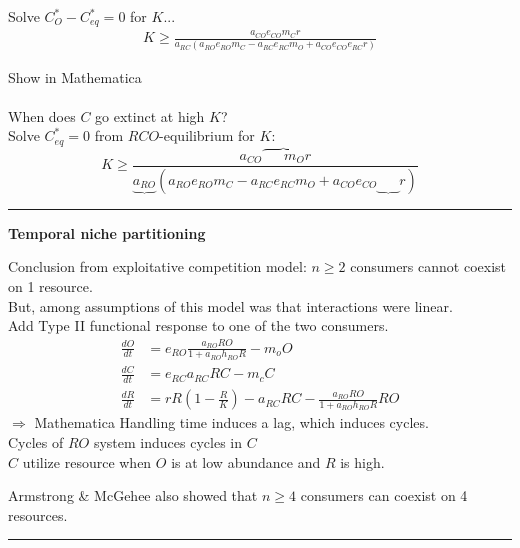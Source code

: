 \documentclass{article}
\newcommand{\note}[1]{\colorbox{gray!30}{#1}}
\newcommand{\ind}{\-\hspace{1cm}}
\newcommand*\circled[1]{\tikz[baseline=(char.base)]{
            \node[shape=circle,draw,inner sep=2pt] (char) {#1};}}
\begin{document}
\ind Solve $C_O^* - C_{eq}^* = 0 $ for $K$...\
\begin{align*}
	K \geq \frac{a_{CO}e_{CO}m_C r}{ a_{RC}(a_{RO}e_{RO}m_C - a_{RC}e_{RC}m_O + a_{CO}e_{CO}e_{RC}r)}
\end{align*}

\note{Show in Mathematica}\\

\circled{6}\\
When does $C$ go extinct at high $K$?\\
\ind Solve $C_{eq}^* = 0$ from $RCO$-equilibrium for $K$:\\
\begin{equation*}
	K \geq \frac{a_{CO}\overbrace{\phantom{e_{CO}}m_O} r}{ \underbrace{a_{RO}}(a_{RO}e_{RO}m_C - a_{RC}e_{RC}m_O + a_{CO}e_{CO}\underbrace{\phantom{e_{RC}}}r )}
\end{equation*}


\rule[0.5ex]{\linewidth}{1pt}

\begin{center}	\textbf{Temporal niche partitioning} \end{center}
Conclusion from exploitative competition model: $n\geq 2$ consumers cannot coexist on 1 resource.\\
But, among assumptions of this model was that interactions were linear.\\

Add Type II functional response to one of the two consumers.
\begin{align*}
	\frac{dO}{dt}&=e_{RO}\frac{a_{RO}R O}{1+a_{RO}h_{RO}R} - m_o O\\
	\frac{dC}{dt}&=e_{RC}a_{RC}RC - m_c C\\
	\frac{dR}{dt}&=r R \left(1-\frac{R}{K}\right) - a_{RC}RC - \frac{a_{RO}R O}{1+a_{RO}h_{RO}R}RO
\end{align*}
\note{$\Rightarrow$ Mathematica}
Handling time induces a lag, which induces cycles.\\
Cycles of $RO$ system induces cycles in $C$\\
\ind $C$ utilize resource when $O$ is at low abundance and $R$ is high. 

Armstrong \& McGehee also showed that $n \geq 4$ consumers can coexist on 4 resources.

\rule[0.5ex]{\linewidth}{1pt}
\end{document}
